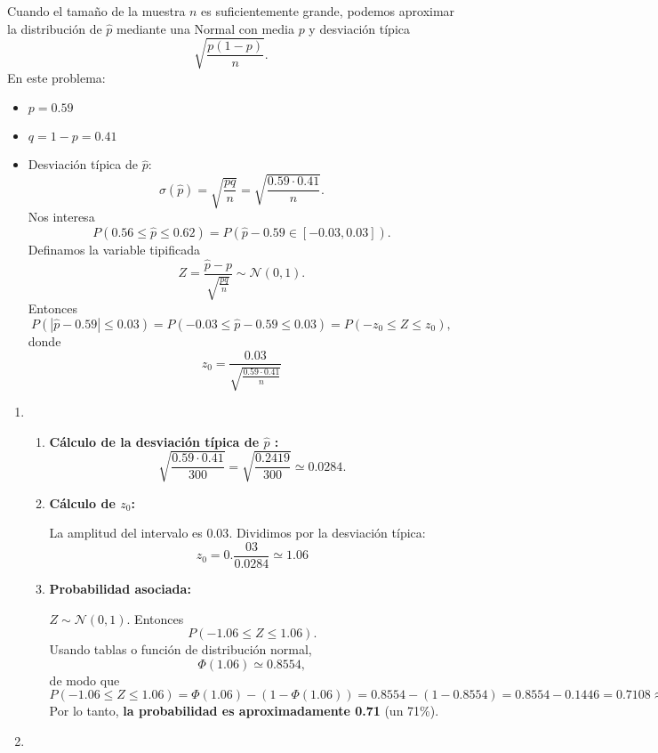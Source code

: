 \begin{enumerate}[label=\color{red}\textbf{\arabic*)}]
    Cuando el tamaño de la muestra $n$ es suficientemente grande, podemos aproximar la distribución de $\hat{p}$ mediante una Normal con media $p$ y desviación típica \[
    \sqrt{\dfrac{p(1-p)}{n}} .
    \] 
    En este problema: 
    \begin{itemize}[label=\textbullet]
        \item $p=0.59$
        \item  $q=1-p=0.41$ 
        \item Desviación típica de $\hat{p}$: \[
        \sigma(\hat{p})=\sqrt{\dfrac{pq}{n}}=\sqrt{\dfrac{0.59\cdot 0.41}{n}}.  
        \] 
        Nos interesa \[
            P(0.56\le \hat{p}\le 0.62)=P(\hat{p}-0.59\in [-0.03,0.03]).
        \] 
        Definamos la variable tipificada \[
        Z=\dfrac{\hat{p}-p}{\sqrt{\frac{pq}{n} } }\sim \mathcal{N}(0,1).
        \] 
        Entonces \[
        P(|\hat{p}-0.59|\le 0.03)=P(-0.03\le \hat{p}-0.59\le 0.03)=P(-z_0\le Z\le z_0),
        \] donde \[
        z_0=\dfrac{0.03}{\sqrt{\frac{0.59\cdot 0.41}{n} } }
        \] 
    \end{itemize}
    \begin{enumerate}[label=\color{red}\textbf{\alph*)}]
        \item {}

             \begin{enumerate}[label=\arabic*)]
                \item \textbf{Cálculo de la desviación típica de $\hat{p}$ :} \[
                \sqrt{\dfrac{0.59\cdot 0.41}{300}} =\sqrt{\dfrac{0.2419}{300}}\simeq 0.0284. 
                \]  
            \item \textbf{Cálculo de $z_0$:}

                La amplitud del intervalo es $0.03$. Dividimos por la desviación típica:  \[
                z_0=0.\dfrac{03}{0.0284}\simeq 1.06
                \] 
            \item \textbf{Probabilidad asociada:}

                $Z\sim \mathcal{N}(0,1)$. Entonces \[
                P(-1.06\le Z\le 1.06).
                \] 
                Usando tablas o función de distribución normal, \[
                \Phi(1.06)\simeq 0.8554,
                \] de modo que \[
                P(-1.06\le Z\le 1.06)=\Phi(1.06)-(1-\Phi(1.06))=0.8554-(1-0.8554)=0.8554-0.1446=0.7108\approx 0.71
                \] 
                Por lo tanto, \textbf{la probabilidad es aproximadamente 0.71} (un 71\%). 
            \end{enumerate}
        \item {} 


\end{enumerate}
\end{enumerate}
